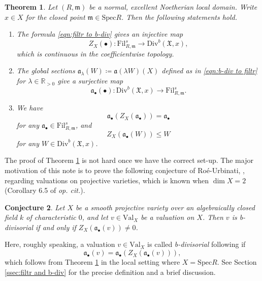 \documentclass[11pt, leqno]{amsart}%
\theoremstyle{plain}
\newtheorem{theorem}{Theorem}%
\newtheorem{conjecture}[theorem]{Conjecture}
\theoremstyle{definition}
\theoremstyle{remark}
\newcommand{\bR}{\mathbb{R}}
\newcommand{\fX}{\mathfrak{X}}
\newcommand{\fa}{\mathfrak{a}}
\newcommand{\fm}{\mathfrak{m}}
\newcommand{\Val}{\mathrm{Val}}
\newcommand{\Spec}{\mathrm{Spec}}
\newcommand{\Div}{\mathrm{Div}}
\newcommand{\Nef}{\mathrm{Nef}}
\newcommand{\Fil}{\mathrm{Fil}}
\begin{document}
\begin{theorem}\label{thm:structure of fil and nef}
	Let $(R,\fm)$ be a normal, excellent Noetherian local domain. Write $x\in X$ for the closed point $\fm\in \Spec R$. Then the following statements hold.
	
	\begin{enumerate}
        \item The formula \eqref{eqn:filtr to b-div} gives an injective map
        \[
            Z_X(\bullet):\Fil^s_{R,\fm}\to\Div^b(\fX,x),
        \]
        which is continuous in the coefficientwise topology. %
		
        \item The global sections $\fa_\lambda(W)\coloneqq \fa(\lambda W)(X)$ defined as in \eqref{eqn:b-div to filtr}
        for $\lambda\in\bR_{>0}$ give a surjective map
        \[
            \fa_\bullet(\bullet):\Div^b(\fX,x)\to\Fil^s_{R,\fm}.
        \]
		
        \item We have 
        \[
            \fa_\bullet(Z_X(\fa_\bullet))=\fa_\bullet
        \]
        for any $\fa_\bullet\in\Fil^s_{R,\fm}$, and 
        \[
            Z_X(\fa_\bullet(W))\le W
        \]
        for any $W\in \Div^b(\fX,x)$.
	\end{enumerate}
    
\end{theorem}

The proof of Theorem \ref{thm:structure of fil and nef} is not hard once we have the correct set-up. The major motivation of this note is to prove the following conjecture of Ro\'e-Urbinati, \cite[Conjecture 3.19]{RU-b-div}, regarding valuations on projective varieties, which is known when $\dim X=2$ (Corollary 6.5 of \emph{op. cit.}). 
    
\begin{conjecture}\label{conj:RU}
    Let $X$ be a smooth projective variety over an algebraically closed field $k$ of characteristic $0$, and let $v\in \Val_X$ be a valuation on $X$. 
    Then $v$ is b-divisorial if and only if $Z_X(\fa_\bullet(v))\ne 0$. 
\end{conjecture}

Here, roughly speaking, a valuation $v\in \Val_X$ is called \emph{b-divisorial} following \cite{RU-b-div} if 
\[
    \fa_{\bullet}(v)=\fa_\bullet(Z_X(\fa_\bullet(v))),
\]
which follows from Theorem \ref{thm:structure of fil and nef} in the local setting where $X=\Spec R$. See Section \ref{ssec:filtr and b-div} for the precise definition and a brief discussion.
\end{document}
